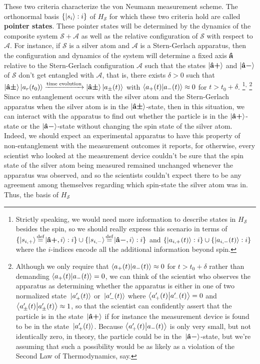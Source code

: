 \documentclass[letter, 12pt]{turabian-thesis}
\theoremstyle{hypothesis}
\newcommand\myeq{\stackrel{\mathclap{\scriptsize\mbox{def}}}{=}}
\newcommand{\uvb}[1]{\vb{\hat{{#1}}}}
\newcommand{\uvbp}[1]{\uvb{#1}\bm{+}}
\newcommand{\uvbm}[1]{\uvb{#1}\bm{-}}
\newcommand{\uvbpm}[1]{\uvb{#1}\bm{\pm}}
\let\origfootnote\footnote %
\renewcommand{\footnote}[1]{%
\noindent %
\origfootnote{#1}}
\begin{document}
These two criteria characterize the von Neumann measurement scheme. The orthonormal basis $\{\ket{s_i}:i\}$ of $H_\mathcal{S}$ for which these two criteria hold are called \textbf{pointer states\label{pointer}}. These pointer states will be determined by the  dynamics of the composite system $\mathcal{S}+\mathcal{A}$ as well as the relative configuration of $\mathcal{S}$ with respect to $\mathcal{A}$. For instance, if $\mathcal{S}$ is a silver atom and $\mathcal{A}$ is a Stern-Gerlach apparatus, then the configuration and dynamics of the system will determine a fixed axis $\uvb{a}$ relative to the Stern-Gerlach configuration $\mathcal{A}$ such that the states $\ket{\uvbp{a}}$ and $\ket{\uvbm{a}}$ of $\mathcal{S}$ don't get entangled with $\mathcal{A}$, that is, there exists $\delta>0$ such that $\ket{\uvbpm{a}}\ket{a_r(t_0)}\xrightarrow{\text{time evolution}}\ket{\uvbpm{a}}\ket{a_\pm(t)}$ with $\ip{a_+(t)}{a_-(t)}\approx 0$ for $t> t_0+\delta$.\footnote{%
Strictly speaking, we would  need more information to describe states in $H_\mathcal{S}$ besides the spin, so we should really express this scenario in terms of $\{\ket{s_{i,+}}\myeq \ket{\uvbp{a},i}:i\}\cup \{\ket{s_{i,-}}\myeq \ket{\uvbm{a},i}:i\}$ and  $\{\ket{a_{i,+}(t)}:i\}\cup\{\ket{a_{i,-}(t)}:i\}$ where the $i$-indices encode all the additional information beyond spin.
}\textsuperscript{, }\footnote{\label{nearzero}Although 
we only require that  $\ip{a_+(t)}{a_-(t)}\approx 0$ for $t> t_0+\delta$ rather than demanding $\ip{a_+(t)}{a_-(t)} = 0$, we can think of the scientist who observes the apparatus as determining whether the apparatus is either in one of two normalized state $\ket*{a_+'(t)}$ or $\ket*{a_-'(t)}$ where 
$\ip{a_+'(t)}{a_-'(t)} = 0$ 
and $\ip{a_\pm'(t)}{a_\pm'(t)}\approx 1$, so that the scientist can confidently assert that the particle is in the state $\ket*{\uvbp{a}}$ if for instance the measurement device is found to be in the state $\ket*{a_+'(t)}$. Because $\ip{a_+'(t)}{a_-(t)}$ is only very small, but not identically zero, in theory, the particle could be in the $\ket*{\uvbm{a}}$-state, but we're assuming that such a possibility would be as likely as a violation of the Second Law of Thermodynamics, say.}
Since no entanglement occurs with the silver atom and the Stern-Gerlach apparatus when the silver atom is in the $\ket{\uvbpm{a}}$-state, then in this situation, we can interact with the apparatus to find out whether the particle is in the $\ket{\uvbp{a}}$-state or the $\ket{\uvbm{a}}$-state without changing the spin state of the silver atom. Indeed, we should expect an experimental apparatus to have this property of non-entanglement with the measurement outcomes it reports, for otherwise, every scientist who looked at the measurement device couldn't be sure that the spin state of the silver atom being measured remained unchanged whenever the apparatus was observed, and so the scientists couldn't expect there to be any agreement among themselves  regarding which spin-state the silver atom was in. Thus, the basis of $H_\mathcal{S}$ 
\end{document}
